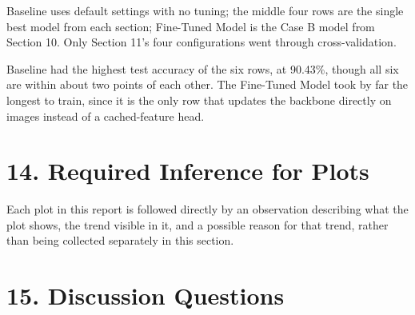 \documentclass[10pt]{article}
\begin{document}
Baseline uses default settings with no tuning; the middle four rows are the single best model
from each section; Fine-Tuned Model is the Case B model from Section 10. Only Section 11's
four configurations went through cross-validation.

Baseline had the highest test accuracy of the six rows, at 90.43\%, though all six are within
about two points of each other. The Fine-Tuned Model took by far the longest to train, since it
is the only row that updates the backbone directly on images instead of a cached-feature head.

\section*{14. Required Inference for Plots}

Each plot in this report is followed directly by an observation describing what the plot
shows, the trend visible in it, and a possible reason for that trend, rather than being
collected separately in this section.

\section*{15. Discussion Questions}
\end{document}
